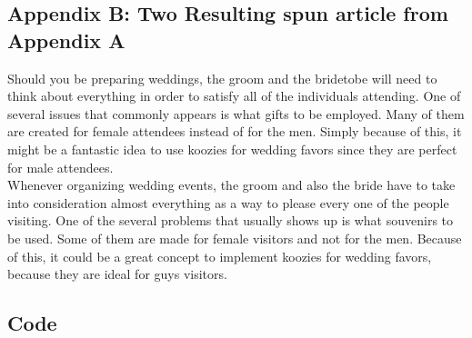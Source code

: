 \documentclass[11pt,letterpaper,oneside, titlepage]{scrartcl}
\begin{document}
\subsection{Appendix B: Two Resulting spun article from Appendix A}


Should you be preparing weddings, the groom and the bridetobe will need to think about everything in order to satisfy all of the individuals attending. One of several issues that commonly appears is what gifts to be employed. Many of them are created for female attendees instead of for the men. Simply because of this, it might be a fantastic idea to use koozies for wedding favors since they are perfect for male attendees.
\\

Whenever organizing wedding events, the groom and also the bride have to take into consideration almost everything as a way to please every one of the people visiting. One of the several problems that usually shows up is what souvenirs to be used. Some of them are made for female visitors and not for the men. Because of this, it could be a great concept to implement koozies for wedding favors, because they are ideal for guys visitors.




\clearpage

\subsection{Code}

\begin{lstlisting}

\end{lstlisting}
\end{document}
